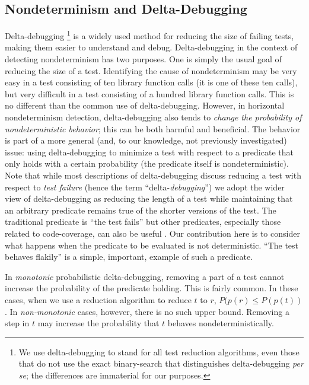\subsection{Nondeterminism and Delta-Debugging}

Delta-debugging \cite{DD}\footnote{We use delta-debugging to stand for
  all test reduction algorithms, even those \cite{CReduce,tstl} that do not use the exact
  binary-search that distinguishes delta-debugging \emph{per se}; the
  differences are immaterial for our purposes.}  is a widely used method for reducing the
size of failing tests, making them easier to understand and debug.
Delta-debugging in the context of detecting nondeterminism has two
purposes.  One is simply the usual goal of reducing the size of a
test.  Identifying the cause of nondeterminism may be very easy in a
test consisting of ten library function calls (it is one of these ten
calls), but very difficult in a test consisting of a hundred library
function calls.  This is no different than the common use of
delta-debugging.  However, in horizontal nondeterminism detection,
delta-debugging also tends to \emph{change the probability of
  nondeterministic behavior}; this can be both harmful and
beneficial.  The behavior is part of a more general (and, to our
knowledge, not previously investigated) issue:  using delta-debugging
to minimize a test with respect to a predicate that only holds with a
certain probability (the predicate itself is nondeterministic).  Note
that while most descriptions of delta-debugging discuss reducing a
test with respect to \emph{test failure} (hence the term
``delta-\emph{debugging}'') we adopt the wider view of delta-debugging
as reducing the length of a test while maintaining that an arbitrary
predicate remains true of the shorter versions of the test.  The
traditional predicate is ``the test fails'' but other predicates,
especially those related to code-coverage, can also be useful
\cite{icst2014,stvrcausereduce,NonAdeq}.  Our contribution here is to consider
what happens when the predicate to be evaluated is not deterministic.
``The test behaves flakily'' is a simple, important, example of such a predicate.

In \emph{monotonic} probabilistic delta-debugging, removing a part of a test cannot
increase the probability of the predicate holding.  This is fairly
common.  In these cases, when we use a reduction algorithm to reduce $t$
to $r$, $P(p(r) \leq P(p(t))$.  In \emph{non-monotonic} cases,
however, there is no such upper bound.  Removing a step in $t$ may
increase the probability that $t$ behaves nondeterministically.

